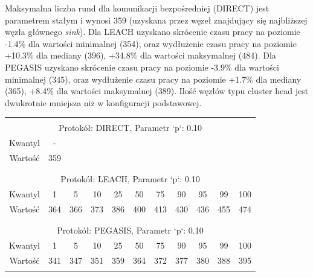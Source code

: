 \documentclass[a4paper,12pt,twoside,openany]{report}
\begin{document}
\par
Maksymalna liczba rund dla komunikacji bezpośredniej (DIRECT) jest parametrem stałym i wynosi 359 (uzyskana przez węzeł znajdujący się najbliższej węzła głównego \textit{sink}).
Dla LEACH uzyskano skrócenie czasu pracy na poziomie -1.4\% dla wartości minimalnej (354), oraz wydłużenie czasu pracy na poziomie +10.3\% dla mediany (396), +34.8\% dla wartości maksymalnej (484).
Dla PEGASIS uzyskano skrócenie czasu pracy na poziomie -3.9\% dla wartości minimalnej (345), oraz wydłużenie czasu pracy na poziomie +1.7\% dla mediany (365), +8.4\% dla wartości maksymalnej (389).
Ilość węzłów typu cluster head jest dwukrotnie mniejsza niż w konfiguracji podstawowej.

\begin{longtable}{*{11}{c}}
\toprule \\*
\multicolumn{11}{c}{Protokół: DIRECT, Parametr `p`: 0.10} \\*
Kwantyl	& -	\\*
Wartość	& 359	\\*
\midrule \\*
\\*
\multicolumn{11}{c}{Protokół: LEACH, Parametr `p`: 0.10} \\*
Kwantyl	& 1	& 5	& 10	& 25	& 50	& 75	& 90	& 95	& 99	& 100	\\*
Wartość	& 364	& 366	& 373	& 386	& 400	& 413	& 430	& 436	& 455	& 474	\\*
\midrule \\*
\\*
\multicolumn{11}{c}{Protokół: PEGASIS, Parametr `p`: 0.10} \\*
Kwantyl	& 1	& 5	& 10	& 25	& 50	& 75	& 90	& 95	& 99	& 100	\\*
Wartość	& 341	& 347	& 351	& 359	& 364	& 372	& 377	& 380	& 388	& 395	\\*	
\bottomrule \\*
\end{longtable}
\end{document}
